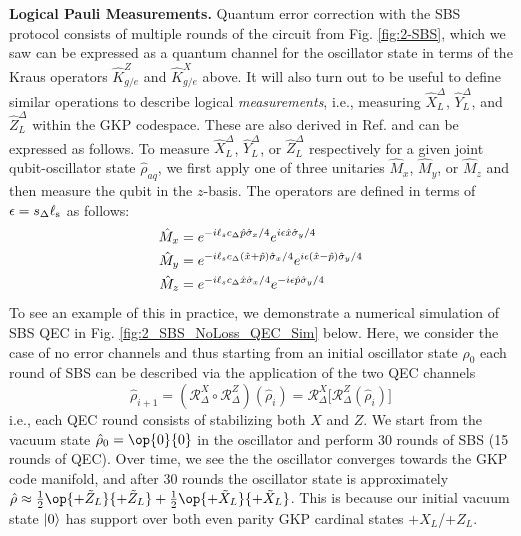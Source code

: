 \noindent\textbf{Logical Pauli Measurements.} Quantum error correction with the SBS protocol consists of multiple rounds of the circuit from Fig. \ref{fig:2-SBS}, which we saw can be expressed as a quantum channel for the oscillator state in terms of the Kraus operators $\hat{K}_{g/e}^{Z}$ and $\hat{K}_{g/e}^{X}$ above. It will also turn out to be useful to define similar operations to describe logical \textit{measurements}, i.e., measuring $\hat{X}_L^\Delta$, $\hat{Y}_L^\Delta$, and $\hat{Z}_L^\Delta$ within the GKP codespace. These are also derived in Ref. \cite{royer2020gkp} and can be expressed as follows. To measure $\hat{X}_L^\Delta$, $\hat{Y}_L^\Delta$, or $\hat{Z}_L^\Delta$ respectively for a given joint qubit-oscillator state $\hat{\rho}_{aq}$, we first apply one of three unitaries $\hat{M}_x$, $\hat{M}_y$, or $\hat{M}_z$ and then measure the qubit in the $z$-basis. The operators are defined in terms of $\epsilon = s_\Delta \ell_{\rm s}$ as follows:
\begin{align}
    \begin{split}
        \hat{M}_x &= e^{-i\ell_s c_\Delta \hat{p}\hat{\sigma}_x / 4} e^{i \epsilon \hat{x}\hat{\sigma}_y/4} \\
        \hat{M}_y &= e^{-i\ell_s c_\Delta (\hat{x}+\hat{p})\hat{\sigma}_x / 4} e^{i \epsilon (\hat{x}-\hat{p})\hat{\sigma}_y/4} \\
        \hat{M}_z &= e^{-i\ell_s c_\Delta \hat{x}\hat{\sigma}_x / 4} e^{-i \epsilon \hat{p}\hat{\sigma}_y/4}
    \end{split}
\end{align}
To see an example of this in practice, we demonstrate a numerical simulation of SBS QEC in Fig. \ref{fig:2_SBS_NoLoss_QEC_Sim} below. Here, we consider the case of no error channels  and thus starting from an initial oscillator state $\hat{\rho}_0$ each round of SBS can be described via the application of the two QEC channels
\begin{equation}
    \hat{\rho}_{i + 1} = (\mathcal{R}_\Delta^X \circ \mathcal{R}_\Delta^Z)(\hat{\rho}_i) = \mathcal{R}_\Delta^X\Big[\mathcal{R}_\Delta^Z(\hat{\rho}_i)\Big]
\end{equation}
i.e., each QEC round consists of stabilizing both $X$ and $Z$. We start from the vacuum state $\hat{\rho}_0 = \op{0}{0}$ in the oscillator and perform 30 rounds of SBS (15 rounds of QEC). Over time, we see the the oscillator converges towards the GKP code manifold, and after 30 rounds the oscillator state is approximately $\hat{\rho} \approx \frac{1}{2}\op{+\tilde{Z}_L}{+\tilde{Z}_L} + \frac{1}{2}\op{+\tilde{X}_L}{+\tilde{X}_L}$. This is because our initial vacuum state $\lvert0\rangle$ has support over both even parity GKP cardinal states $+X_L$/+$Z_L$. 

